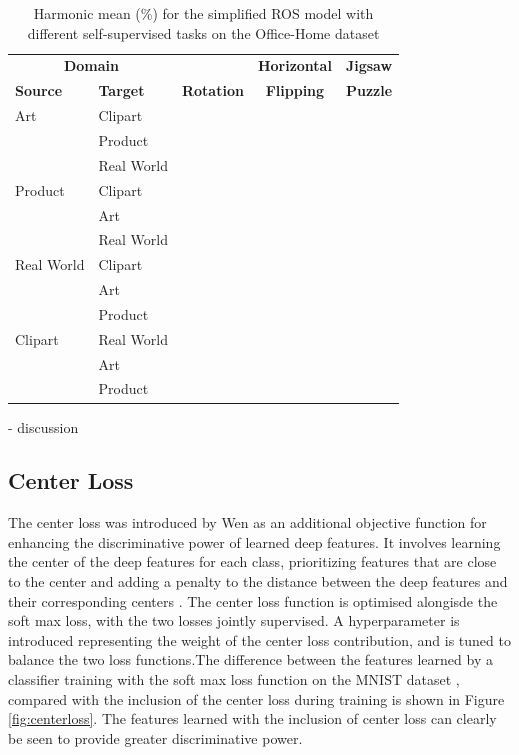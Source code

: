 \documentclass[10pt,twocolumn,letterpaper]{article}
\begin{document}
\begin{table}[!htb]
\small
  \centering
  \begin{tabular}{@{}|ll|ccc|@{}}
    \hline
\multicolumn{2}{|c|}{\textbf{Domain}} & & \textbf{Horizontal} & \textbf{Jigsaw} \\
\textbf{Source} & \textbf{Target} & \textbf{Rotation} & \textbf{Flipping} & \textbf{Puzzle} \\ \hline
Art & Clipart & &  &  \\
& Product & & & \\
 & Real World & & & \\ \hline
Product & Clipart & & & \\
& Art & & & \\
& Real World & & & \\ \hline
Real World & Clipart & & & \\
 & Art & & & \\
 & Product & & & \\ \hline
Clipart & Real World & & & \\
 & Art & & & \\
& Product & & & \\
    \hline
  \end{tabular}
  \caption{Harmonic mean (\%) for the simplified ROS model with different self-supervised tasks on the Office-Home dataset}
  \label{tab:selfs}
\end{table}


- discussion


\subsection{Center Loss}

The center loss was introduced by Wen \etal \cite{Wen2016} as an additional objective function for enhancing the discriminative power of learned deep features. It involves learning the center of the deep features for each class, prioritizing features that are close to the center and adding a penalty to the distance between the deep features and their corresponding centers \cite{Wen2016}. The center loss function is optimised alongisde the soft max loss, with the two losses jointly supervised. A hyperparameter is introduced representing the weight of the center loss contribution, and is tuned to balance the two loss functions.The difference between the features learned by a classifier training with the soft max loss function on the MNIST dataset \cite{MNIST}, compared with the inclusion of the center loss during training is shown in Figure \ref{fig:centerloss}. The features learned with the inclusion of center loss can clearly be seen to provide greater discriminative power.
\end{document}
